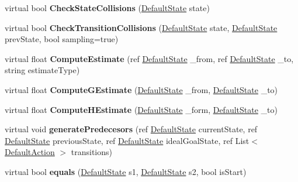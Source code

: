 \begin{DoxyCompactItemize}
\item 
\hypertarget{class_planning_domain_base_a07faaa66f466a9d7ce3c4ffe37e62984}{virtual bool {\bfseries Check\-State\-Collisions} (\hyperlink{class_default_state}{Default\-State} state)}\label{class_planning_domain_base_a07faaa66f466a9d7ce3c4ffe37e62984}

\item 
\hypertarget{class_planning_domain_base_ae897f168e9458471332f33a311f6ef0d}{virtual bool {\bfseries Check\-Transition\-Collisions} (\hyperlink{class_default_state}{Default\-State} state, \hyperlink{class_default_state}{Default\-State} prev\-State, bool sampling=true)}\label{class_planning_domain_base_ae897f168e9458471332f33a311f6ef0d}

\item 
\hypertarget{class_planning_domain_base_af2d85bdc3ba261d45e3866d14d1bed2d}{virtual float {\bfseries Compute\-Estimate} (ref \hyperlink{class_default_state}{Default\-State} \-\_\-from, ref \hyperlink{class_default_state}{Default\-State} \-\_\-to, string estimate\-Type)}\label{class_planning_domain_base_af2d85bdc3ba261d45e3866d14d1bed2d}

\item 
\hypertarget{class_planning_domain_base_a0dbe3459a5c80ef6879b1a876473783e}{virtual float {\bfseries Compute\-G\-Estimate} (\hyperlink{class_default_state}{Default\-State} \-\_\-from, \hyperlink{class_default_state}{Default\-State} \-\_\-to)}\label{class_planning_domain_base_a0dbe3459a5c80ef6879b1a876473783e}

\item 
\hypertarget{class_planning_domain_base_aa36b018efa1d0e43b79c21e0af6c8d3a}{virtual float {\bfseries Compute\-H\-Estimate} (\hyperlink{class_default_state}{Default\-State} \-\_\-form, \hyperlink{class_default_state}{Default\-State} \-\_\-to)}\label{class_planning_domain_base_aa36b018efa1d0e43b79c21e0af6c8d3a}

\item 
\hypertarget{class_planning_domain_base_af33cbec77e0c8255f8d7d01586bc9ed4}{virtual void {\bfseries generate\-Predecesors} (ref \hyperlink{class_default_state}{Default\-State} current\-State, ref \hyperlink{class_default_state}{Default\-State} previous\-State, ref \hyperlink{class_default_state}{Default\-State} ideal\-Goal\-State, ref List$<$ \hyperlink{class_default_action}{Default\-Action} $>$ transitions)}\label{class_planning_domain_base_af33cbec77e0c8255f8d7d01586bc9ed4}

\item 
\hypertarget{class_planning_domain_base_af9f3423873c7dc7e5c720bb978ba3828}{virtual bool {\bfseries equals} (\hyperlink{class_default_state}{Default\-State} s1, \hyperlink{class_default_state}{Default\-State} s2, bool is\-Start)}\label{class_planning_domain_base_af9f3423873c7dc7e5c720bb978ba3828}


\end{DoxyCompactItemize}
